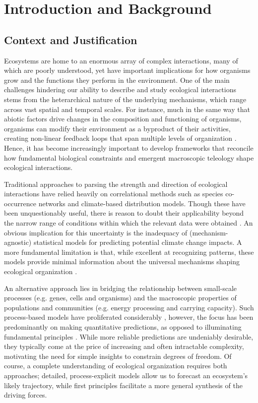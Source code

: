 \chapter{Introduction and Background}

\section{Context and Justification}
Ecosystems are home to an enormous array of complex interactions, many of which are poorly understood, yet have important implications for how organisms grow and the functions they perform in the environment. One of the main challenges hindering our ability to describe and study ecological interactions stems from the heterarchical nature of the underlying mechanisms, which range across vast spatial and temporal scales. For instance, much in the same way that abiotic factors drive changes in the composition and functioning of organisms, organisms can modify their environment as a byproduct of their activities, creating non-linear feedback loops that span multiple levels of organization \cite{scheffer2001a, meacock2023a, philippot2023a}. Hence, it has become increasingly important to develop frameworks that reconcile how fundamental biological constraints and emergent macroscopic teleology shape ecological interactions. 

Traditional approaches to parsing the strength and direction of ecological interactions have relied heavily on correlational methods such as species co-occurrence networks and climate-based distribution models. Though these have been unquestionably useful, there is reason to doubt their applicability beyond the narrow range of conditions within which the relevant data were obtained \cite{barnes2022a, goberna2022a, pinto2022a}. An obvious implication for this uncertainty is the inadequacy of (mechanism-agnostic) statistical models for predicting potential climate change impacts. A more fundamental limitation is that, while excellent at recognizing patterns, these models provide minimal information about the universal mechanisms shaping ecological organization \cite{machado_modeling_2011, van_den_berg_ecological_2022}. 

An alternative approach lies in bridging the relationship between small-scale processes (e.g. genes, cells and organisms) and the macroscopic properties of populations and communities (e.g. energy processing and carrying capacity). Such process-based models have proliferated considerably \cite{pilowsky_process-explicit_2022}, however, the focus has been predominantly on making quantitative predictions, as opposed to illuminating fundamental principles \cite{marquet2014a}. While more reliable predictions are undeniably desirable, they typically come at the price of increasing and often intractable complexity, motivating the need for simple insights to constrain degrees of freedom. Of course, a complete understanding of ecological organization requires both approaches; detailed, process-explicit models allow us to forecast an ecosystem's likely trajectory, while first principles facilitate a more general synthesis of the driving forces. 

